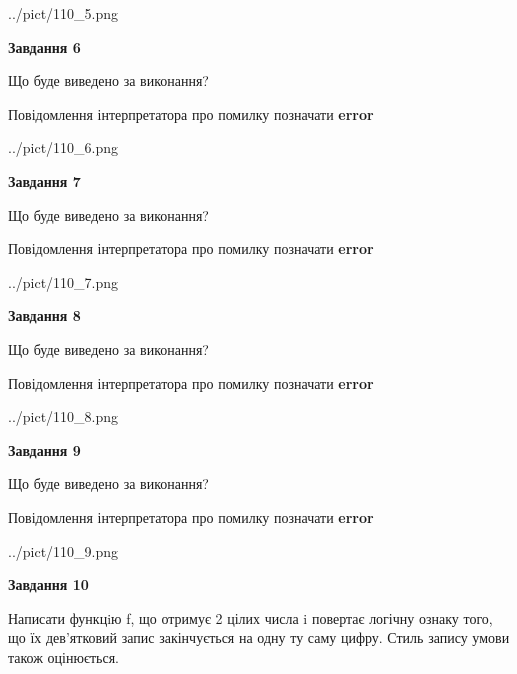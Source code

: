 \documentclass[12pt, ukrainian]{article}
\begin{document}
{\begin {large}
\begin{center}
	{../pict/110_5.png}
\end{center}
\newpage

{\begin {center}\textbf{Завдання 6}\end {center}}\par
Що буде виведено за виконання? \par
Повідомлення інтерпретатора про помилку позначати \textbf{error}

\begin{center}
	{../pict/110_6.png}
\end{center}
\newpage

{\begin {center}\textbf{Завдання 7}\end {center}}\par
Що буде виведено за виконання? \par
Повідомлення інтерпретатора про помилку позначати \textbf{error}

\begin{center}
	{../pict/110_7.png}
\end{center}
\newpage

{\begin {center}\textbf{Завдання 8}\end {center}}\par
Що буде виведено за виконання? \par
Повідомлення інтерпретатора про помилку позначати \textbf{error}

\begin{center}
	{../pict/110_8.png}
\end{center}
\newpage

{\begin {center}\textbf{Завдання 9}\end {center}}\par
Що буде виведено за виконання? \par
Повідомлення інтерпретатора про помилку позначати \textbf{error}

\begin{center}
	{../pict/110_9.png}
\end{center}
\newpage

{\begin {center}\textbf{Завдання 10}\end {center}}\par

Написати функцiю f, що отримує 2 цілих числа i повертає логічну ознаку того, що їх дев'ятковий запис закінчується на одну ту саму цифру. Стиль запису умови також оцінюється.\par
\newpage

\end {large}}
\end{document}
